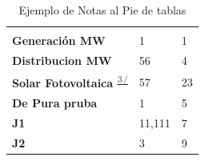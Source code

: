 \documentclass{sener2025}
\begin{document}
\begin{tabladorado}
  \begin{longtable}{B{3cm}p{2cm}p{2cm}}
    \caption{Ejemplo de Notas al Pie de tablas}\label{tab:ejemplo_de_notas_al_pie_de_tab}\\
    \toprule
      &  &  \\
    \midrule
    \endfirsthead

      &  &  \\
    \midrule
    \endhead

    \bottomrule
    \endlastfoot

    \textbf{Generación MW} & 1 & 1 \\
    \textbf{Distribucion MW} & 56 & 4 \\
    \textbf{Solar Fotovoltaica \textsuperscript{\hyperlink{nota3}{\textcolor{gray}{3/}}}} & 57 & 23 \\
    \textbf{De Pura pruba} & 1 & 5 \\
    \textbf{J1} & 11,111 & 7 \\
    \textbf{J2} & 3 & 9 \\
  \end{longtable}
\end{tabladorado}
\end{document}
